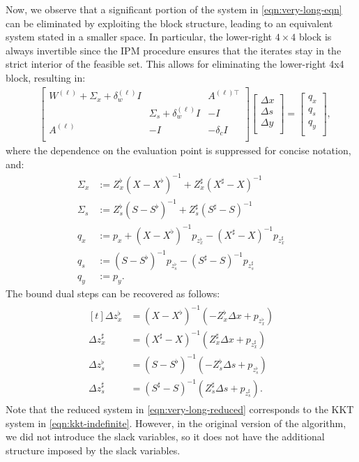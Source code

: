 Now, we observe that a significant portion of the system in
\eqref{eqn:very-long-eqn} can be eliminated by exploiting the block
structure, leading to an equivalent system stated in a smaller
space. In particular, the lower-right $4\times 4$ block is always
invertible since the IPM procedure ensures that the iterates stay in
the strict interior of the feasible set. This allows for eliminating
the lower-right 4x4 block, resulting in:
\begin{align}\label{eqn:very-long-reduced}
  &\begin{bmatrix}
    W^{(\ell)}  + \Sigma_x + \delta^{(\ell)}_w I & & A^{(\ell)\top} \\
    & \Sigma_s + \delta^{(\ell)}_w I & -I\\
    A^{(\ell)}& -I & -\delta_c I\\
  \end{bmatrix}
  \begin{bmatrix}
    \Delta x \\
    \Delta s \\
    \Delta y \\
  \end{bmatrix}=
  \begin{bmatrix}
    q_x \\
    q_s\\
    q_y\\
  \end{bmatrix},
\end{align}
where the dependence on the evaluation point is suppressed for concise notation, and:
\begin{align*}
  \Sigma_x&:= Z^\flat_x (X-X^\flat)^{-1}+ Z^\sharp_x (X^\sharp-X)^{-1}\\
  \Sigma_s&:= Z^\flat_s (S-S^\flat)^{-1}+ Z^\sharp_s (S^\sharp-S)^{-1}\\
  q_x&:=p_x + (X-X^\flat)^{-1} p_{z^\flat_x}-  (X^\sharp-X)^{-1} p_{z^\sharp_x}\\
  q_s&:= (S-S^\flat)^{-1} p_{z^\flat_s}-  (S^\sharp-S)^{-1} p_{z^\sharp_s}\\
  q_y&:=p_y.
\end{align*}
The bound dual steps can be recovered as follows:
\begin{align}\label{eqn:recover-1}
  \begin{aligned}[t]
    \Delta z^\flat_x &= \left(X-X^\flat\right)^{-1} \left(-Z^\flat_x \Delta x  + p_{z^\flat_x}\right)\\
    \Delta z^\sharp_x &= \left(X^\sharp-X\right)^{-1} \left(Z^\sharp_x \Delta x  + p_{z^\sharp_x}\right)\\
    \Delta z^\flat_s &= \left(S-S^\flat\right)^{-1} \left(-Z^\flat_s \Delta s  + p_{z^\flat_s}\right)\\
    \Delta z^\sharp_s &= \left(S^\sharp-S\right)^{-1} \left(Z^\sharp_s \Delta s  + p_{z^\sharp_s}\right).
  \end{aligned}
\end{align}
Note that the reduced system in \eqref{eqn:very-long-reduced}
corresponds to the KKT system in \eqref{eqn:kkt-indefinite}. However,
in the original version of the algorithm, we did not introduce the
slack variables, so it does not have the additional structure imposed
by the slack variables.

